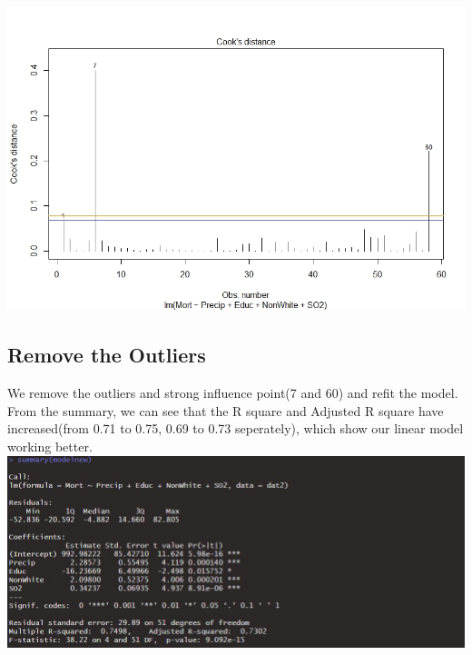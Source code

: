 \documentclass[12pt,a4paper]{article}
\begin{document}
\begin{enumerate}
\includegraphics[scale=0.6]{cook.jpeg}
\end{enumerate}
\subsection{Remove the Outliers}
We remove the outliers and strong influence point(7 and 60) and refit the model. From the summary, we can see that the R square and Adjusted R square have increased(from 0.71 to 0.75, 0.69 to 0.73 seperately), which show our linear model working better.
\newline
\includegraphics[scale=0.6]{Modelnew.JPG}
\end{document}

